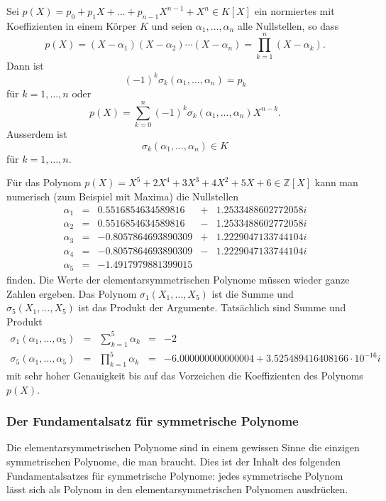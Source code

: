 \begin{satz}
Sei $p(X) = p_0+p_1X+\dots +p_{n-1}X^{n-1} + X^n\in K[X]$ ein normiertes
mit Koeffizienten in einem Körper $K$ und seien $\alpha_1,\dots,\alpha_n$
alle Nullstellen, so dass 
\[
p(X)
=
(X-\alpha_1)(X-\alpha_2)\cdots(X-\alpha_n) =
\prod_{k=1}^n (X-\alpha_k).
\]
Dann ist 
\[
(-1)^k
\sigma_k(\alpha_1,\dots,\alpha_n) 
=
p_k
\]
für $k=1,\dots,n$ oder
\[
p(X)
=
\sum_{k=0}^n
(-1)^k
\sigma_k(\alpha_1,\dots,\alpha_n) X^{n-k}.
\]
Ausserdem ist
\[
\sigma_k(\alpha_1,\dots,\alpha_n) \in K
\]
für $k=1,\dots,n$.
\end{satz}

\begin{beispiel}
Für das Polynom $p(X) = X^5 + 2X^4+3X^3+4X^2+5X+6\in\mathbb{Z}[X]$
kann man numerisch (zum Beispiel mit Maxima) die Nullstellen
\[
\renewcommand{\arraycolsep}{1.5pt}
\begin{array}{rcrcl}
\alpha_1 &=&  0.5516854634589816 &+& 1.2533488602772058 i\\
\alpha_2 &=&  0.5516854634589816 &-& 1.2533488602772058 i\\
\alpha_3 &=& -0.8057864693890309 &+& 1.2229047133744104 i\\
\alpha_4 &=& -0.8057864693890309 &-& 1.2229047133744104 i\\
\alpha_5 &=& -1.4917979881399015 & &
\end{array}
\]
finden.
Die Werte der elementarsymmetrischen Polynome müssen wieder
ganze Zahlen ergeben. 
Das Polynom $\sigma_1(X_1,\dots,X_5)$ ist die Summe
und $\sigma_5(X_1,\dots,X_5)$ ist das Produkt der Argumente.
Tatsächlich sind Summe und Produkt
\[
\renewcommand{\arraycolsep}{1.5pt}
\begin{array}{rcccl}
\sigma_1(\alpha_1,\dots,\alpha_5)
&=&
\displaystyle
\sum_{k=1}^5 \alpha_k
&=&
-2
\\
\sigma_5(\alpha_1,\dots,\alpha_5)
&=&
\displaystyle
\prod_{k=1}^5 \alpha_k
&=&
-6.000000000000004 + 3.525489416408166\cdot 10^{-16}i
\end{array}
\]
mit sehr hoher Genauigkeit bis auf das Vorzeichen die Koeffizienten
des Polynoms $p(X)$.
\end{beispiel}

%
%
\subsubsection{Der Fundamentalsatz für symmetrische Polynome}
Die elementarsymmetrischen Polynome sind in einem gewissen Sinne
die einzigen symmetrischen Polynome, die man braucht.
Dies ist der Inhalt des folgenden Fundamentalsatzes für
symmetrische Polynome: jedes symmetrische Polynom lässt sich
als Polynom in den elementarsymmetrischen Polynomen ausdrücken.

